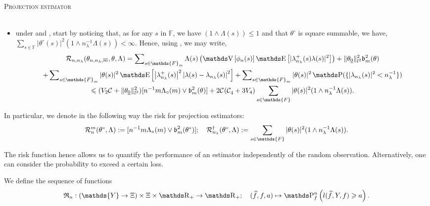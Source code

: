 \begin{ex}{\textsc{Projection estimator} \\}
\begin{itemize}
\begin{multline*}
\end{multline*}
\item under  and , start by noticing that, as for any $s$ in $\mathds{F}$, we have $(1 \wedge \Lambda(s)) \leq 1$ and that $\theta^{\circ}$ is square summable, we have, $\sum_{s \in \mathds{F}} \vert \theta^{\circ}(s) \vert^{2} (1 \wedge n_{\lambda}^{-1} \Lambda(s)) < \infty$. Hence, using , we may write,
\begin{multline*}
  \mathcal{R}_{n, \ssE}(\theta_{n, n_{\lambda}, \overline{m}}, \theta, \Lambda) = \sum\nolimits_{s \in \mathds{F}_{m}} \Lambda(s) \left(\V\left[ \phi_{n}(s) \right] \E\left[ \vert \lambda_{n_{\lambda}}^{+}(s) \lambda(s) \vert^{2} \right]\right) + \Vert \theta_{\underline{0}}\Vert_{l^{2}}^{2}\mathfrak{b}_{m}^{2}(\theta)\\
  + \sum\nolimits_{s \in \mathds{F}_{m}} \vert \theta(s) \vert^{2} \E \left[ \left\vert \lambda_{n_{\lambda}}^{+}(s) \right\vert^{2} \left\vert \lambda(s) - \lambda_{n_{\lambda}}(s)\right\vert^{2} \right] + \sum\nolimits_{s \in \mathds{F}_{m}} \vert \theta(s) \vert^{2} \P( \{\vert \lambda_{n_{\lambda}}(s) \vert^{2} < n_{\lambda}^{-1}\})\\
  \leq (V_{2} \cst{} + \Vert \theta_{\underline{0}}\Vert_{l^{2}}^{2}) [n^{-1} m \Lambda_{\circ}(m) \vee \mathfrak{b}_{m}^{2}(\theta)] + 2 \cst{} (\cst{4} + 3 V_{4}) \sum_{s \in \mathds{F}}\vert \theta(s) \vert^{2} (1 \wedge n_{\lambda}^{-1} \Lambda(s)).
\end{multline*}
\end{itemize}
\remEnd
\end{ex}

\begin{nota}\label{rates}
In particular, we denote in the following way the risk for projection estimators:
\begin{multline*}
\mathcal{R}_{n}^{m}(\theta^{\circ}, \Lambda) := [n^{-1} m \Lambda_{\circ}(m) \vee \b_{m}^{2}(\theta^{\circ})]; \quad \mathcal{R}_{n_{\lambda}}^{\dagger}(\theta^{\circ}, \Lambda) := \sum_{s \in \mathds{F}}\vert \theta(s) \vert^{2} (1 \wedge n_{\lambda}^{-1} \Lambda(s)).
\end{multline*}
\end{nota}
The risk function hence allows us to quantify the performance of an estimator independently of the random observation.
Alternatively, one can consider the probability to exceed a certain loss.

\begin{de}\label{DE_INTRO_FREQ_DECISION_RISKFUNCTION_THRESHOLDOVERCOME}
We define the sequence of functions
\[\mathfrak{R}_{n} : (\mathds{Y} \rightarrow \Xi) \times \Xi \times \R_{+} \rightarrow \R_{+}; \quad (\widehat{f}, f, a) \mapsto \P_{f}^{n}\left(l(\widehat{f}, Y, f) \geq a \right).\]
\assEnd
\end{de}


